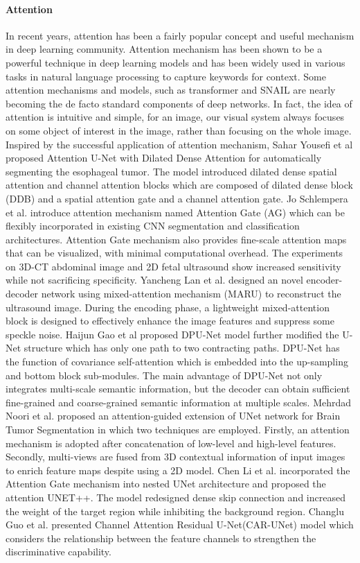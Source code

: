 \documentclass[UTF8]{article} %
\begin{document}
\paragraph{Attention}
In recent years, attention has been a fairly popular concept and useful mechanism in deep learning community. Attention mechanism has been shown to be a powerful technique in deep learning models and has been widely used in various tasks in natural language processing to capture keywords for context. Some attention mechanisms and models, such as transformer and SNAIL are nearly becoming the de facto standard components of deep networks. In fact, the idea of attention is intuitive and simple, for an image, our visual system always focuses on some object of interest in the image, rather than focusing on the whole image. Inspired by the successful application of attention mechanism, Sahar Yousefi et al proposed Attention U-Net with Dilated Dense Attention for automatically segmenting the esophageal tumor\cite{YousefiSELMZDS20}. The model introduced dilated dense spatial attention and channel attention blocks which are composed of dilated dense block (DDB) and a spatial attention gate and a channel attention gate. Jo Schlempera et al. introduce attention mechanism named Attention Gate (AG) which can be flexibly incorporated in existing CNN segmentation and classification architectures\cite{OktaySFLHMMMHKGR18}. Attention Gate mechanism also provides fine-scale attention maps that can be visualized, with minimal computational overhead. The experiments on 3D-CT abdominal image and 2D fetal ultrasound show increased sensitivity while not sacrificing specificity. Yancheng Lan et al. designed an novel encoder-decoder network using mixed-attention mechanism (MARU) to reconstruct the ultrasound image\cite{LanZ20}. During the encoding phase, a lightweight mixed-attention block is designed to effectively enhance the image features and suppress some speckle noise. Haijun Gao et al proposed DPU-Net model further modified the U-Net structure which has only one path to two contracting paths\cite{GaoZPZ20}. DPU-Net has the function of covariance self-attention which is embedded into the up-sampling and bottom block sub-modules. The main advantage of DPU-Net not only integrates multi-scale semantic information, but the decoder can obtain sufficient fine-grained and coarse-grained semantic information at multiple scales. Mehrdad Noori et al. proposed an attention-guided extension of UNet network for Brain Tumor Segmentation in which two techniques are employed\cite{NooriBM20}. Firstly, an attention mechanism is adopted after concatenation of low-level and high-level features. Secondly, multi-views are fused from 3D contextual information of input images to enrich feature maps despite using a 2D model. Chen Li et al. incorporated the Attention Gate mechanism into nested UNet architecture and proposed the attention UNET++. The model redesigned dense skip connection and increased the weight of the target region while inhibiting the background region\cite{LiTCLGJW20}. Changlu Guo et al. presented Channel Attention Residual U-Net(CAR-UNet) model which considers the relationship between the feature channels to strengthen the discriminative capability\cite{GauSYZ20}. 
\end{document}
